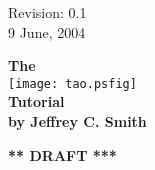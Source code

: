 \documentclass{book}
\begin{document}

\thispagestyle{empty}

\begin{flushright}
\large
  Revision: 0.1 \\
  9 June, 2004 \\
\end{flushright}

\vfill

{
\begin{center}
{\Huge \sf\bf The} \\
\vskip 0.1in
\texttt{[image: tao.psfig]} \\
\vskip 0.1in
{\Huge \sf\bf Tutorial} \\
\vskip 0.1in
{\normalsize \sf\bf by Jeffrey C. Smith} \\
\end{center}
}

\vskip 1in
\begin{center}
{\Huge \bf *** DRAFT ***}
\end{center}
\vfill
\break
\end{document}
